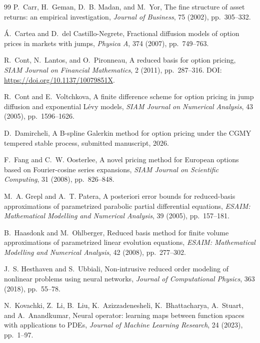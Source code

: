 \documentclass[11pt]{amsart}
\theoremstyle{remark}
\begin{document}
\begin{thebibliography}{99}
P.~Carr, H.~Geman, D.~B. Madan, and M.~Yor,
\newblock The fine structure of asset returns: an empirical investigation,
\newblock \emph{Journal of Business}, 75 (2002), pp.~305--332.

\'A.~Cartea and D.~del Castillo-Negrete,
\newblock Fractional diffusion models of option prices in markets with jumps,
\newblock \emph{Physica A}, 374 (2007), pp.~749--763.

R.~Cont, N.~Lantos, and O.~Pironneau,
\newblock A reduced basis for option pricing,
\newblock \emph{SIAM Journal on Financial Mathematics}, 2 (2011),
pp.~287--316. DOI: \url{https://doi.org/10.1137/10079851X}.

R.~Cont and E.~Voltchkova,
\newblock A finite difference scheme for option pricing in jump diffusion and
exponential L\'evy models,
\newblock \emph{SIAM Journal on Numerical Analysis}, 43 (2005),
pp.~1596--1626.

D.~Damircheli,
\newblock A B-spline Galerkin method for option pricing under the CGMY
tempered stable process,
\newblock submitted manuscript, 2026.

F.~Fang and C.~W. Oosterlee,
\newblock A novel pricing method for European options based on Fourier-cosine
series expansions,
\newblock \emph{SIAM Journal on Scientific Computing}, 31 (2008),
pp.~826--848.

M.~A. Grepl and A.~T. Patera,
\newblock A posteriori error bounds for reduced-basis approximations of
parametrized parabolic partial differential equations,
\newblock \emph{ESAIM: Mathematical Modelling and Numerical Analysis},
39 (2005), pp.~157--181.

B.~Haasdonk and M.~Ohlberger,
\newblock Reduced basis method for finite volume approximations of
parametrized linear evolution equations,
\newblock \emph{ESAIM: Mathematical Modelling and Numerical Analysis},
42 (2008), pp.~277--302.

J.~S. Hesthaven and S.~Ubbiali,
\newblock Non-intrusive reduced order modeling of nonlinear problems using
neural networks,
\newblock \emph{Journal of Computational Physics}, 363 (2018), pp.~55--78.

N.~Kovachki, Z.~Li, B.~Liu, K.~Azizzadenesheli, K.~Bhattacharya, A.~Stuart,
and A.~Anandkumar,
\newblock Neural operator: learning maps between function spaces with
applications to PDEs,
\newblock \emph{Journal of Machine Learning Research}, 24 (2023), pp.~1--97.


\end{thebibliography}
\end{document}
